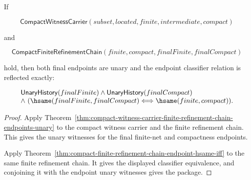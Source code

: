 \begin{theorem}
\label{thm:compact-witness-carrier-finite-refinement-endpoint-package}
If

$$
\mathsf{CompactWitnessCarrier}(subset,located,finite,intermediate,compact)
$$

and

$$
\mathsf{CompactFiniteRefinementChain}(finite,compact,finalFinite,finalCompact)
$$

hold, then both final endpoints are unary and the endpoint classifier relation is
reflected exactly:

$$
\begin{array}{l}
\mathsf{UnaryHistory}(finalFinite)\land\mathsf{UnaryHistory}(finalCompact)
\\
\land\
(\hsame(finalFinite,finalCompact)\Longleftrightarrow\hsame(finite,compact)).
\end{array}
$$
\end{theorem}
\begin{proof}
Apply Theorem~\ref{thm:compact-witness-carrier-finite-refinement-chain-endpoints-unary}
to the compact witness carrier and the finite refinement chain. This gives the
unary witnesses for the final finite-net and compactness endpoints.

Apply Theorem~\ref{thm:compact-finite-refinement-chain-endpoint-hsame-iff} to
the same finite refinement chain. It gives the displayed classifier equivalence,
and conjoining it with the endpoint unary witnesses gives the package.
\end{proof}

